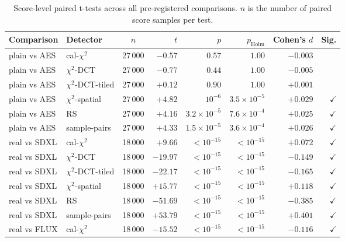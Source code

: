 \documentclass[10pt,twocolumn,a4paper]{article}
\begin{document}
\begin{table}[h]
\centering\footnotesize
\caption{Score-level paired t-tests across all pre-registered comparisons. $n$ is the number of paired score samples per test.}
\label{tab:appendix-ttest}
\setlength{\tabcolsep}{4pt}\renewcommand{\arraystretch}{1.1}
\begin{tabular}{@{}l l c r r r r r@{}}
\toprule
\textbf{Comparison} & \textbf{Detector} & \textbf{$n$} & \textbf{$t$} & \textbf{$p$} & \textbf{$p_\text{Holm}$} & \textbf{Cohen's $d$} & \textbf{Sig.} \\
\midrule
plain vs AES   & cal-$\chi^2$       & 27\,000 & $-0.57$ & $0.57$ & $1.00$ & $-0.003$ & \\
plain vs AES   & $\chi^2$-DCT       & 27\,000 & $-0.77$ & $0.44$ & $1.00$ & $-0.005$ & \\
plain vs AES   & $\chi^2$-DCT-tiled & 27\,000 & $+0.12$ & $0.90$ & $1.00$ & $+0.001$ & \\
plain vs AES   & $\chi^2$-spatial   & 27\,000 & $+4.82$ & $10^{-6}$  & $3.5\!\times\!10^{-5}$ & $+0.029$ & $\checkmark$ \\
plain vs AES   & RS                 & 27\,000 & $+4.16$ & $3.2\!\times\!10^{-5}$ & $7.6\!\times\!10^{-4}$ & $+0.025$ & $\checkmark$ \\
plain vs AES   & sample-pairs       & 27\,000 & $+4.33$ & $1.5\!\times\!10^{-5}$ & $3.6\!\times\!10^{-4}$ & $+0.026$ & $\checkmark$ \\
\midrule
real vs SDXL   & cal-$\chi^2$       & 18\,000 & $+9.66$  & $<\!10^{-15}$ & $<\!10^{-15}$ & $+0.072$ & $\checkmark$ \\
real vs SDXL   & $\chi^2$-DCT       & 18\,000 & $-19.97$ & $<\!10^{-15}$ & $<\!10^{-15}$ & $-0.149$ & $\checkmark$ \\
real vs SDXL   & $\chi^2$-DCT-tiled & 18\,000 & $-22.17$ & $<\!10^{-15}$ & $<\!10^{-15}$ & $-0.165$ & $\checkmark$ \\
real vs SDXL   & $\chi^2$-spatial   & 18\,000 & $+15.77$ & $<\!10^{-15}$ & $<\!10^{-15}$ & $+0.118$ & $\checkmark$ \\
real vs SDXL   & RS                 & 18\,000 & $-51.69$ & $<\!10^{-15}$ & $<\!10^{-15}$ & $-0.385$ & $\checkmark$ \\
real vs SDXL   & sample-pairs       & 18\,000 & $+53.79$ & $<\!10^{-15}$ & $<\!10^{-15}$ & $+0.401$ & $\checkmark$ \\
\midrule
real vs FLUX   & cal-$\chi^2$       & 18\,000 & $-15.52$ & $<\!10^{-15}$ & $<\!10^{-15}$ & $-0.116$ & $\checkmark$ \\

\end{tabular}
\end{table}
\end{document}
